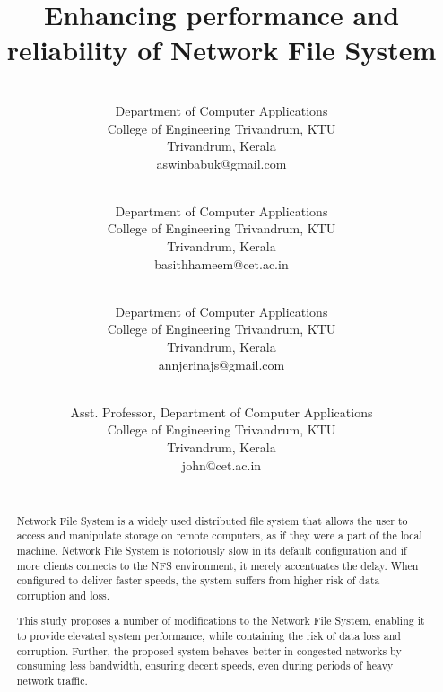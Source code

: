 \documentclass[conference]{IEEEtran}
\begin{document}
\title{Enhancing performance and reliability of Network File System\\
}

\author{
\\
Department of Computer Applications \\
College of Engineering Trivandrum, KTU\\
Trivandrum, Kerala \\
aswinbabuk@gmail.com\\
\and {}\\
Department of Computer Applications \\
College of Engineering Trivandrum, KTU\\
Trivandrum, Kerala \\
basithhameem@cet.ac.in\\
\and {}\\
Department of Computer Applications \\
College of Engineering Trivandrum, KTU\\
Trivandrum, Kerala  \\
annjerinajs@gmail.com\\
\and {}\\
Asst. Professor, Department of Computer Applications \\
College of Engineering Trivandrum, KTU\\
Trivandrum, Kerala \\
john@cet.ac.in\\
\\
}
\maketitle

\begin{abstract}
Network File System is a widely used distributed file system that allows the
user to access and manipulate storage on remote computers, as if they were a
part of the local machine. Network File System is notoriously slow in its 
default configuration and if more clients connects to the NFS environment,
it merely accentuates the delay. When configured to deliver faster speeds,
the system suffers from higher risk of data corruption and loss.

This study proposes a number of modifications to the Network File System,
enabling it to provide elevated system performance, while containing
the risk of data loss and corruption. Further, the proposed system behaves
better in congested networks by consuming less bandwidth, ensuring decent
speeds, even during periods of heavy network traffic.
\end{abstract}
\end{document}
